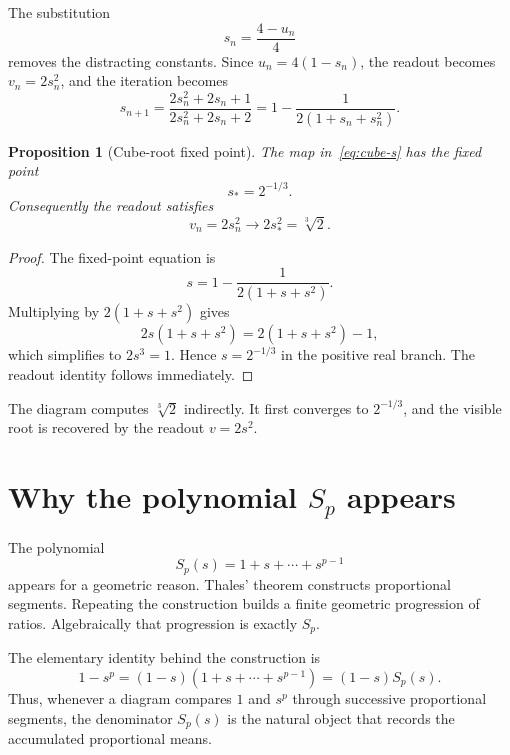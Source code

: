 \documentclass[10pt,a4paper]{article}
\theoremstyle{plain}
\newtheorem{proposition}[theorem]{Proposition}
\theoremstyle{definition}
\theoremstyle{remark}
\newcommand{\cbrt}[1]{\sqrt[3]{#1}}
\newcommand{\Sp}{S_p}
\newenvironment{takeaway}{%
  \begin{center}\begin{minipage}{0.92\linewidth}\small\itshape\color{blue!45!black}%
}{%
  \end{minipage}\end{center}%
}
\begin{document}
The substitution
\[
  s_n=\frac{4-u_n}{4}
\]
removes the distracting constants.  Since $u_n=4(1-s_n)$, the readout becomes
$v_n=2s_n^2$, and the iteration becomes
\begin{equation}
  s_{n+1}
  =\frac{2s_n^2+2s_n+1}{2s_n^2+2s_n+2}
  =1-\frac{1}{2(1+s_n+s_n^2)}.
  \label{eq:cube-s}
\end{equation}

\begin{proposition}[Cube-root fixed point]
The map in~\eqref{eq:cube-s} has the fixed point
\[
  s_*=2^{-1/3}.
\]
Consequently the readout satisfies
\[
  v_n=2s_n^2 \longrightarrow 2s_*^2=\cbrt{2}.
\]
\end{proposition}

\begin{proof}
The fixed-point equation is
\[
  s=1-\frac{1}{2(1+s+s^2)}.
\]
Multiplying by $2(1+s+s^2)$ gives
\[
  2s(1+s+s^2)=2(1+s+s^2)-1,
\]
which simplifies to $2s^3=1$.  Hence $s=2^{-1/3}$ in the positive real branch.
The readout identity follows immediately.
\end{proof}

\begin{takeaway}
The diagram computes $\cbrt{2}$ indirectly.  It first converges to
$2^{-1/3}$, and the visible root is recovered by the readout $v=2s^2$.
\end{takeaway}

\section{Why the polynomial \texorpdfstring{$S_p$}{Sp} appears}
\label{sec:geometry}

The polynomial
\[
  \Sp(s)=1+s+\cdots+s^{p-1}
\]
appears for a geometric reason.  Thales' theorem constructs proportional
segments.  Repeating the construction builds a finite geometric progression of
ratios.  Algebraically that progression is exactly $\Sp$.

The elementary identity behind the construction is
\begin{equation}
  1-s^p=(1-s)(1+s+\cdots+s^{p-1})=(1-s)\Sp(s).
  \label{eq:telescopic-Sp}
\end{equation}
Thus, whenever a diagram compares $1$ and $s^p$ through successive proportional
segments, the denominator $\Sp(s)$ is the natural object that records the
accumulated proportional means.
\end{document}
